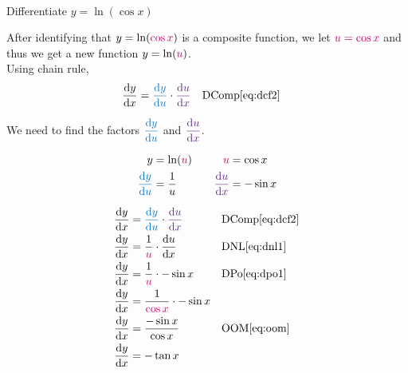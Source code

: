 \documentclass[20150903-160354-rs2.2-MarksMathNotebook.tex]{subfiles}
\begin{document}
\begin{example}[id:20141128-155506] \label{20141128-155506} \hfill \\

Differentiate $y=\ln(\cos x)$

\soln

\solnsteps
After identifying that $y=\ln (\cRed{\cos x})$ is a composite function, we let $\cRed{u=\cos x}$ and thus we get a new function $y=\ln (\cRed{u})$.\\

Using chain rule,
\begin{align*}
\dydx &= \cBlue{\dydu} \cdot \cPurple{\dudx} && \text{DComp} \eqref{eq:dcf2}
\end{align*}

We need to find the factors $\cBlue{\dydu}$ and $\cPurple{\dudx}$.

\begin{alignat*}{2}
		y &= \ln (\cRed{u})				&\quad	 		\cRed{u}		&= \cos x \\
	\cBlue{\dydu} &= \dfrac{1}{u}		&\quad 	 \cPurple{\dudx}	 &= - \sin x
\end{alignat*}

\begin{align*}
\dydx &= \cBlue{\dydu} \cdot \cPurple{\dudx} && \text{DComp} \eqref{eq:dcf2} \\
\dydx &= \dfrac{1}{\cRed{u}} \cdot \dudx && \text{DNL} \eqref{eq:dnl1} \\
\dydx &= \dfrac{1}{\cRed{u}} \cdot - \sin x && \text{DPo} \eqref{eq:dpo1} \\
\dydx &= \dfrac{1}{\cRed{\cos x}} \cdot - \sin x \\	%
\dydx &= \dfrac{-\sin x}{\cos x} && \text{OOM} \eqref{eq:oom} \\
\dydx &= -\tan x %
\end{align*}
\end{example}
\end{document}
